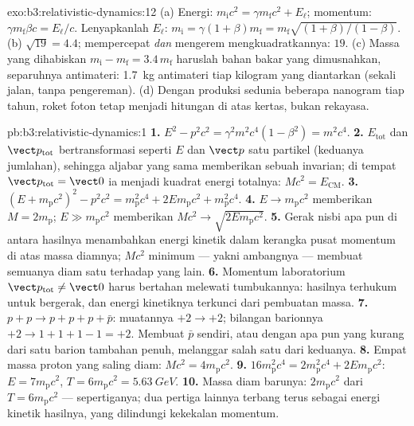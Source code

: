 \begin{solution}{exo:b3:relativistic-dynamics:12}
(a) Energi: $m_{\text{i}}c^2 = \gamma m_{\text{f}}c^2 + E_\ell$;
momentum: $\gamma m_{\text{f}}\beta c = E_\ell/c$. Lenyapkanlah
$E_\ell$: $m_{\text{i}} = \gamma(1 + \beta)m_{\text{f}} =
m_{\text{f}}\sqrt{(1+\beta)/(1-\beta)}$. (b) $\sqrt{19} = 4.4$;
mempercepat \emph{dan} mengerem mengkuadratkannya: $19$. (c) Massa yang
dihabiskan $m_{\text{i}} - m_{\text{f}} = 3.4\,m_{\text{f}}$ haruslah
bahan bakar yang dimusnahkan, separuhnya antimateri: \qty{1.7}{kg}
antimateri tiap kilogram yang diantarkan (sekali jalan, tanpa
pengereman). (d) Dengan produksi sedunia beberapa nanogram tiap tahun,
roket foton tetap menjadi hitungan di atas kertas, bukan rekayasa.
\end{solution}

\begin{solution}{pb:b3:relativistic-dynamics:1}
\textbf{1.} $E^2 - p^2c^2 = \gamma^2m^2c^4(1 - \beta^2) = m^2c^4$.
\textbf{2.} $E_{\text{tot}}$ dan $\vect p_{\text{tot}}$ bertransformasi
seperti $E$ dan $\vect p$ satu partikel (keduanya jumlahan), sehingga
aljabar yang sama memberikan sebuah invarian; di tempat
$\vect p_{\text{tot}} = \vect 0$ ia menjadi kuadrat energi totalnya:
$Mc^2 = E_{\text{CM}}$.
\textbf{3.} $(E + m_{\text{p}}c^2)^2 - p^2c^2 = m_{\text{p}}^2c^4 +
2Em_{\text{p}}c^2 + m_{\text{p}}^2c^4$.
\textbf{4.} $E \to m_{\text{p}}c^2$ memberikan $M = 2m_{\text{p}}$;
$E \gg m_{\text{p}}c^2$ memberikan $Mc^2 \to \sqrt{2Em_{\text{p}}c^2}$.
\textbf{5.} Gerak nisbi apa pun di antara hasilnya menambahkan energi
kinetik dalam kerangka pusat momentum di atas massa diamnya; $Mc^2$
minimum --- yakni ambangnya --- membuat semuanya diam satu terhadap yang
lain.
\textbf{6.} Momentum laboratorium $\vect p_{\text{tot}} \neq \vect 0$
harus bertahan melewati tumbukannya: hasilnya terhukum untuk bergerak,
dan energi kinetiknya terkunci dari pembuatan massa.
\textbf{7.} $p + p \to p + p + p + \bar p$: muatannya $+2 \to +2$;
bilangan barionnya $+2 \to 1 + 1 + 1 - 1 = +2$. Membuat $\bar p$ sendiri,
atau dengan apa pun yang kurang dari satu barion tambahan penuh,
melanggar salah satu dari keduanya.
\textbf{8.} Empat massa proton yang saling diam: $Mc^2 =
4m_{\text{p}}c^2$.
\textbf{9.} $16m_{\text{p}}^2c^4 = 2m_{\text{p}}^2c^4 +
2Em_{\text{p}}c^2$: $E = 7m_{\text{p}}c^2$, $T = 6m_{\text{p}}c^2 =
\qty{5.63}{GeV}$.
\textbf{10.} Massa diam barunya: $2m_{\text{p}}c^2$ dari $T =
6m_{\text{p}}c^2$ --- sepertiganya; dua pertiga lainnya terbang terus
sebagai energi kinetik hasilnya, yang dilindungi kekekalan momentum.

\end{solution}

